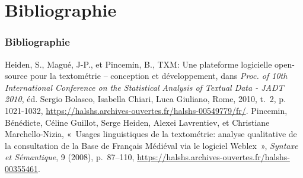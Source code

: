 \documentclass{beamer}
\begin{document}
\section{Bibliographie}

\begin{frame}[fragile]
\frametitle{Bibliographie} 

\begin{thebibliography}{Heiden et al., 2010}
	 Heiden, S., Magué, J-P., et Pincemin, B., \og{}TXM: Une plateforme logicielle open-source pour la textométrie – conception et développement\fg{}, dans \textit{Proc. of 10th International Conference on the Statistical Analysis of Textual Data - JADT 2010}, éd. Sergio Bolasco, Isabella Chiari, Luca Giuliano, Rome, 2010, t.~2, p. 1021-1032, \url{https://halshs.archives-ouvertes.fr/halshs-00549779/fr/}.
	 Pincemin, Bénédicte, Céline Guillot, Serge Heiden, Alexei Lavrentiev, et Christiane Marchello-Nizia, « Usages linguistiques de la textométrie: analyse qualitative de la consultation de la Base de Français Médiéval via le logiciel Weblex », \textit{Syntaxe et Sémantique}, 9 (2008), p.~87–110, \url{https://halshs.archives-ouvertes.fr/halshs-00355461}.
	
	
	
\end{thebibliography}


\end{frame}
\end{document}

